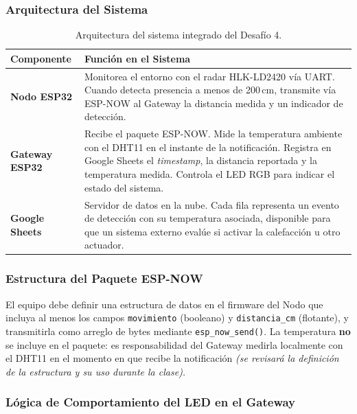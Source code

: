 \documentclass[12pt,leqno]{article}
\begin{document}
\subsubsection*{Arquitectura del Sistema}

\begin{table}[h]
\centering
\begin{tabular}{|p{3.5cm}|p{9.5cm}|}
\hline
\textbf{Componente} & \textbf{Funci\'on en el Sistema} \\
\hline
\textbf{Nodo ESP32} & Monitorea el entorno con el radar HLK-LD2420 v\'ia UART.
Cuando detecta presencia a menos de 200\,cm, transmite v\'ia ESP-NOW al Gateway
la distancia medida y un indicador de detecci\'on. \\
\hline
\textbf{Gateway ESP32} & Recibe el paquete ESP-NOW. Mide la temperatura ambiente
con el DHT11 en el instante de la notificaci\'on. Registra en Google Sheets el
\textit{timestamp}, la distancia reportada y la temperatura medida. Controla el
LED RGB para indicar el estado del sistema. \\
\hline
\textbf{Google Sheets} & Servidor de datos en la nube. Cada fila representa un
evento de detecci\'on con su temperatura asociada, disponible para que un sistema
externo eval\'ue si activar la calefacci\'on u otro actuador. \\
\hline
\end{tabular}
\caption{Arquitectura del sistema integrado del Desaf\'io 4.}
\end{table}

\subsubsection*{Estructura del Paquete ESP-NOW}

El equipo debe definir una estructura de datos en el firmware del Nodo que incluya
al menos los campos \texttt{movimiento} (booleano) y \texttt{distancia\_cm}
(flotante), y transmitirla como arreglo de bytes mediante \texttt{esp\_now\_send()}.
La temperatura \textbf{no} se incluye en el paquete: es responsabilidad del Gateway
medirla localmente con el DHT11 en el momento en que recibe la notificaci\'on
\textit{(se revisar\'a la definici\'on de la estructura y su uso durante la clase).}

\subsubsection*{L\'ogica de Comportamiento del LED en el Gateway}
\end{document}
